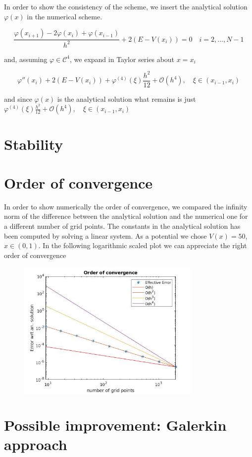 \documentclass[a4paper,oneside]{book}
\theoremstyle{definition}
\theoremstyle{plain}
\newcommand{\var}{\varphi}
\begin{document}
In order to show the consistency of the scheme, we insert the analytical solution $\var(x)$ in the numerical scheme.

 \[ \frac{\var(x_{i+1})-2\var(x_i)+\var(x_{i-1})}{h^2}+2(E-V(x_i))=0 \quad i=2, \ldots, N-1 \]

and, assuming $\var \in \mathcal{C}^{4}$, we expand in Taylor series about $x=x_i$

\[ \var ''(x_i)+2(E-V(x_i))+ \var^{(4)}(\xi) \frac{h^2}{12}+\mathcal{O}(h^4), \quad \xi \in (x_{i-1},x_i)\]

and since $\var(x)$ is the analytical solution what remains is just $ \var^{(4)}(\xi) \frac{h^2}{12}+\mathcal{O}(h^4), \quad \xi \in (x_{i-1},x_i)$

\section{Stability}







\section{Order of convergence}

In order to show numerically the order of convergence, we compared the infinity norm of the difference between the analytical solution and the numerical one for a different number of grid points. The constants in the analytical solution has been computed by solving a linear system. 
As a potential we chose  $V(x)=50$, $ x \in (0,1)$. In the following logarithmic scaled plot we can appreciate the right order of convergence 
\begin{figure}[h]
	 \centering
	  \includegraphics[width=0.8\textwidth]{OrderConst.jpg}
\end{figure}


\section{Possible improvement:  Galerkin approach}
\end{document}

